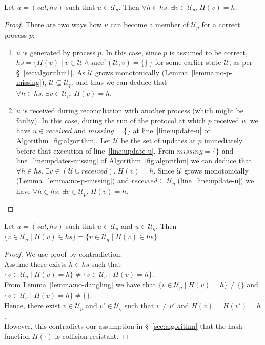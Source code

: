 \documentclass[a4paper,anonymous,USenglish]{lipics-v2019}
\begin{document}
\begin{lemma}\label{lemma:no-dangling}
Let $u = (\mathit{val}, \mathit{hs})$ such that $u \in \mathcal{U}_p$.
Then $\forall h \in \mathit{hs}.\; \exists v \in \mathcal{U}_p.\; H(v) = h$.
\end{lemma}
\begin{proof}
There are two ways how $u$ can become a member of $\mathcal{U}_p$ for a correct process $p$:
\begin{enumerate}
    \item $u$ is generated by process $p$.
    In this case, since $p$ is assumed to be correct, $\mathit{hs} = \{H(v) \mid v \in \mathcal{U} \wedge \mathrm{succ}^1(\mathcal{U}, v) = \{\}\,\}$ for some earlier state $\mathcal{U}$, as per \S~\ref{sec:algorithm1}.
    As $\mathcal{U}$ grows monotonically (Lemma~\ref{lemma:no-p-missing}), $\mathcal{U} \subseteq \mathcal{U}_p$, and thus we can deduce that $\forall h \in \mathit{hs}.\; \exists v \in \mathcal{U}_p.\; H(v) = h$.
    \item $u$ is received during reconciliation with another process (which might be faulty).
    In this case, during the run of the protocol at which $p$ received $u$, we have $u \in \mathit{received}$ and $\mathit{missing} = \{\}$ at line~\ref{line:update-u} of Algorithm~\ref{fig:algorithm}.
    Let $\mathcal{U}$ be the set of updates at $p$ immediately before that execution of line~\ref{line:update-u}.
    From $\mathit{missing} = \{\}$ and line~\ref{line:updates-missing} of Algorithm~\ref{fig:algorithm} we can deduce that $\forall h \in \mathit{hs}.\; \exists v \in (\mathcal{U} \cup \mathit{received}).\; H(v) = h$.
    Since $\mathcal{U}$ grows monotonically (Lemma~\ref{lemma:no-p-missing}) and $\mathit{received} \subseteq \mathcal{U}_p$ (line~\ref{line:update-u}) we have $\forall h \in \mathit{hs}.\; \exists v \in \mathcal{U}_p.\; H(v) = h$.
\end{enumerate}
\end{proof}

\begin{lemma}\label{lemma:no-collision}
Let $u = (\mathit{val}, \mathit{hs})$ such that $u \in \mathcal{U}_p$ and $u \in \mathcal{U}_q$.
Then $\{v \in \mathcal{U}_p \mid H(v) \in \mathit{hs}\} = \{v \in \mathcal{U}_q \mid H(v) \in \mathit{hs}\}$.
\end{lemma}
\begin{proof}
We use proof by contradiction.\\
Assume there exists $h \in \mathit{hs}$ such that $\{v \in \mathcal{U}_p \mid H(v) = h\} \neq \{v \in \mathcal{U}_q \mid H(v) = h\}$.\\
From Lemma~\ref{lemma:no-dangling} we have that $\{v \in \mathcal{U}_p \mid H(v) = h\} \neq \{\}$ and $\{v \in \mathcal{U}_q \mid H(v) = h\} \neq \{\}$.\\
Hence, there exist $v \in \mathcal{U}_p$ and $v' \in \mathcal{U}_q$ such that $v \neq v'$ and $H(v) = H(v') = h$.\\
However, this contradicts our assumption in \S~\ref{sec:algorithm} that the hash function $H(\cdot)$ is collision-resistant.
\end{proof}
\end{document}
